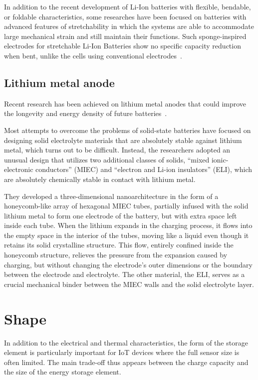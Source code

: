 \documentclass{EPL-master-thesis-covers-EN}
\begin{document}
In addition to the recent development of Li-Ion batteries with  flexible, bendable, or foldable characteristics, some researches have been focused on batteries with advanced features of stretchability in which the systems are able to accommodate large mechanical strain and still maintain their functions. Such sponge-inspired electrodes for stretchable Li-Ion Batteries show no specific capacity reduction when bent, unlike the cells using conventional electrodes~\cite{doi:10.1002/adma.201505299}.

\subsection*{Lithium metal anode}

Recent research has been achieved on lithium metal anodes that could improve the longevity and energy density of future batteries~\cite{10.1038/s41586-020-1972-y}.

Most attempts to overcome the problems of solid-state batteries have focused on designing solid electrolyte materials that are absolutely stable against lithium metal, which turns out to be difficult.  Instead, the researchers adopted an unusual design that utilizes two additional classes of solids, “mixed ionic-electronic conductors” (MIEC) and “electron and Li-ion insulators” (ELI), which are absolutely chemically stable in contact with lithium metal. 

They developed a three-dimensional nanoarchitecture in the form of a honeycomb-like array of hexagonal MIEC tubes, partially infused with the solid lithium metal to form one electrode of the battery, but with extra space left inside each tube. When the lithium expands in the charging process, it flows into the empty space in the interior of the tubes, moving like a liquid even though it retains its solid crystalline structure. This flow, entirely confined inside the honeycomb structure, relieves the pressure from the expansion caused by charging, but without changing the electrode’s outer dimensions or the boundary between the electrode and electrolyte. The other material, the ELI, serves as a crucial mechanical binder between the MIEC walls and the solid electrolyte layer.

\section{Shape}

In addition to the electrical and thermal characteristics, the form of the storage element is particularly important for IoT devices where the full sensor size is often limited. The main trade-off thus appears between the charge capacity and the size of the energy storage element.
\end{document}
